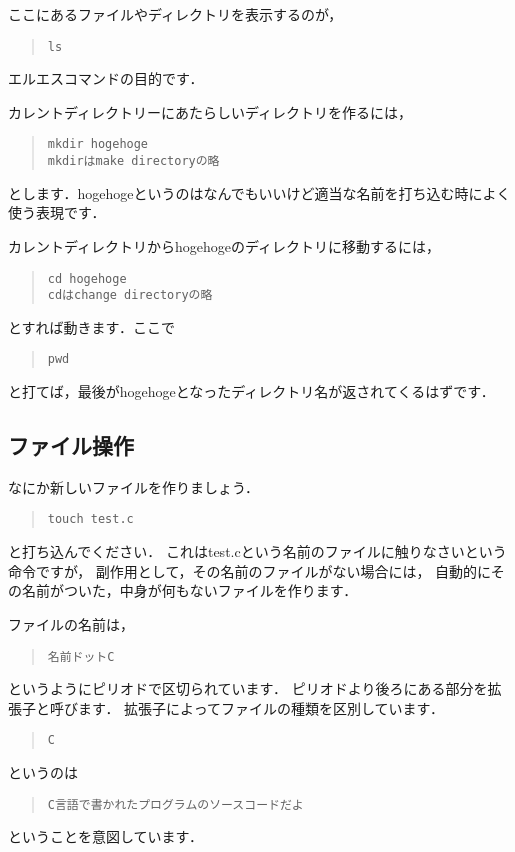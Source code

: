 \documentclass[12pt,a4paper]{jsarticle}
\begin{document}
ここにあるファイルやディレクトリを表示するのが，
\begin{quote}\begin{verbatim}
ls
\end{verbatim}\end{quote}
エルエスコマンドの目的です．

カレントディレクトリーにあたらしいディレクトリを作るには，
\begin{quote}\begin{verbatim}
mkdir hogehoge
mkdirはmake directoryの略
\end{verbatim}\end{quote}
とします．hogehogeというのはなんでもいいけど適当な名前を打ち込む時によく使う表現です．

カレントディレクトリからhogehogeのディレクトリに移動するには，
\begin{quote}\begin{verbatim}
cd hogehoge
cdはchange directoryの略
\end{verbatim}\end{quote}
とすれば動きます．ここで
\begin{quote}\begin{verbatim}
pwd
\end{verbatim}\end{quote}
と打てば，最後がhogehogeとなったディレクトリ名が返されてくるはずです．

\subsection{ファイル操作}
なにか新しいファイルを作りましょう．
\begin{quote}\begin{verbatim}
touch test.c
\end{verbatim}\end{quote}
と打ち込んでください．
これはtest.cという名前のファイルに触りなさいという命令ですが，
副作用として，その名前のファイルがない場合には，
自動的にその名前がついた，中身が何もないファイルを作ります．

ファイルの名前は，
\begin{quote}\begin{verbatim}
名前ドットC
\end{verbatim}\end{quote}
というようにピリオドで区切られています．
ピリオドより後ろにある部分を拡張子と呼びます．
拡張子によってファイルの種類を区別しています．
\begin{quote}\begin{verbatim}
C
\end{verbatim}\end{quote}
というのは
\begin{quote}\begin{verbatim}
C言語で書かれたプログラムのソースコードだよ
\end{verbatim}\end{quote}
ということを意図しています．
\end{document}
